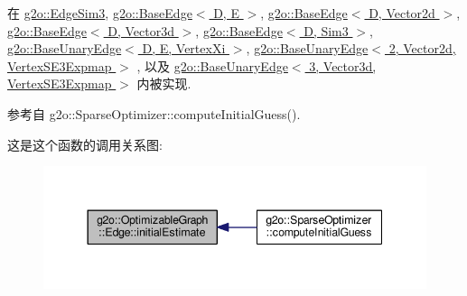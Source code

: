 在 \hyperlink{classg2o_1_1EdgeSim3_afac4cc093af6f54adb278c142f33dcca}{g2o\-::\-Edge\-Sim3}, \hyperlink{classg2o_1_1BaseEdge_a0c3d9763f1dc504627df75e0f381ca70}{g2o\-::\-Base\-Edge$<$ D, E $>$}, \hyperlink{classg2o_1_1BaseEdge_a0c3d9763f1dc504627df75e0f381ca70}{g2o\-::\-Base\-Edge$<$ D, Vector2d $>$}, \hyperlink{classg2o_1_1BaseEdge_a0c3d9763f1dc504627df75e0f381ca70}{g2o\-::\-Base\-Edge$<$ D, Vector3d $>$}, \hyperlink{classg2o_1_1BaseEdge_a0c3d9763f1dc504627df75e0f381ca70}{g2o\-::\-Base\-Edge$<$ D, Sim3 $>$}, \hyperlink{classg2o_1_1BaseUnaryEdge_a3d3311901116092cf817b094f6a0b44b}{g2o\-::\-Base\-Unary\-Edge$<$ D, E, Vertex\-Xi $>$}, \hyperlink{classg2o_1_1BaseUnaryEdge_a3d3311901116092cf817b094f6a0b44b}{g2o\-::\-Base\-Unary\-Edge$<$ 2, Vector2d, Vertex\-S\-E3\-Expmap $>$} , 以及 \hyperlink{classg2o_1_1BaseUnaryEdge_a3d3311901116092cf817b094f6a0b44b}{g2o\-::\-Base\-Unary\-Edge$<$ 3, Vector3d, Vertex\-S\-E3\-Expmap $>$} 内被实现.



参考自 g2o\-::\-Sparse\-Optimizer\-::compute\-Initial\-Guess().



这是这个函数的调用关系图\-:
\nopagebreak
\begin{figure}[H]
\begin{center}
\leavevmode
\includegraphics[width=344pt]{classg2o_1_1OptimizableGraph_1_1Edge_a9519f8892e97f03daacb44ea50ac7f4e_icgraph}
\end{center}
\end{figure}


